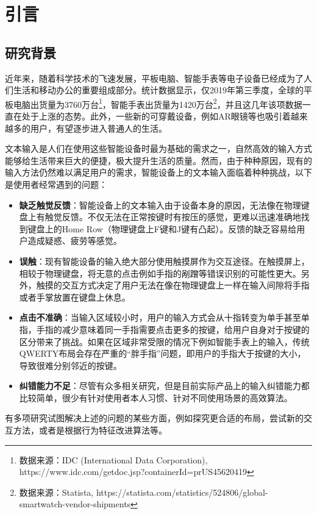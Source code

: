 \chapter{引言}
\label{cha:intro}
\section{研究背景}
近年来，随着科学技术的飞速发展，平板电脑、智能手表等电子设备已经成为了人们生活和移动办公的重要组成部分。统计数据显示，仅2019年第三季度，全球的平板电脑出货量为3760万台\footnote{数据来源：IDC (International Data Corporation), https://www.idc.com/getdoc.jsp?containerId=prUS45620419}，智能手表出货量为1420万台\footnote{数据来源：Statista, https://statista.com/statistics/524806/global-smartwatch-vendor-shipments}，并且这几年该项数据一直在处于上涨的态势。此外，一些新的可穿戴设备，例如AR眼镜等也吸引着越来越多的用户，有望逐步进入普通人的生活。

文本输入是人们在使用这些智能设备时最为基础的需求之一，自然高效的输入方式能够给生活带来巨大的便捷，极大提升生活的质量。然而，由于种种原因，现有的输入方法仍然难以满足用户的需求，智能设备上的文本输入面临着种种挑战，以下是使用者经常遇到的问题：
\begin{itemize}
    \item \textbf{缺乏触觉反馈}：智能设备上的文本输入由于设备本身的原因，无法像在物理键盘上有触觉反馈。不仅无法在正常按键时有按压的感觉，更难以迅速准确地找到键盘上的Home Row（物理键盘上F键和J键有凸起）\cite{flatglass2011findlater}。反馈的缺乏容易给用户造成疑惑、疲劳等感觉。
    \item \textbf{误触}：现有智能设备的输入绝大部分使用触摸屏作为交互途径。在触摸屏上，相较于物理键盘，将无意的点击例如手指的剐蹭等错误识别的可能性更大。另外，触摸的交互方式决定了用户无法在像在物理键盘上一样在输入间隙将手指或者手掌放置在键盘上休息。
    \item \textbf{点击不准确}：当输入区域较小时，用户的输入方式会从十指转变为单手甚至单指，手指的减少意味着同一手指需要点击更多的按键，给用户自身对于按键的区分带来了挑战。如果在区域非常受限的情况下例如智能手表上的输入，传统QWERTY布局会存在严重的“胖手指”问题，即用户的手指大于按键的大小，导致很难分别邻近的按键。
    \item \textbf{纠错能力不足}：尽管有众多相关研究，但是目前实际产品上的输入纠错能力都比较简单，很少有针对使用者本人习惯、针对不同使用场景的高效算法。
\end{itemize}

有多项研究试图解决上述的问题的某些方面，例如探究更合适的布局\cite{2019tiptext}\cite{2011li1line}，尝试新的交互方法\cite{2018forceboard}，或者是根据行为特征改进算法\cite{palmboard2020}\cite{2018shitoast}等。

